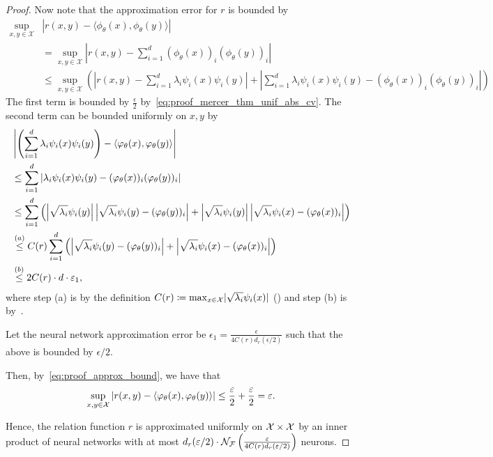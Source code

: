\begin{proof}
	Now note that the approximation error for $r$ is bounded by
	\begin{equation}\label{eq:proof_approx_bound}
		\begin{split}
			\sup_{x, y \in \mathcal{X}}&{
				\left\lvert r(x,y) - \langle \phi_\theta(x), \phi_\theta(y) \rangle \right\rvert}\\
			&= \sup_{x, y \in \mathcal{X}}{
				\left\lvert r(x,y) - \sum_{i=1}^{d}{(\phi_\theta(x))_i (\phi_\theta(y))_i} \right\rvert} \\
			&\leq \sup_{x,y \in \mathcal{X}}{ \left(
				\left\lvert r(x,y) - \sum_{i=1}^{d}{\lambda_i \psi_i(x) \psi_i(y)} \right\rvert
				+ \left\lvert \sum_{i=1}^{d}{\lambda_i \psi_i(x) \psi_i(y) - (\phi_\theta(x))_i (\phi_\theta(y))_i} \right\rvert  \right) }
		\end{split}
	\end{equation}
	The first term is bounded by $\frac{\epsilon}{2}$ by~\eqref{eq:proof_mercer_thm_unif_abs_cv}. The second term can be bounded uniformly on $x,y$ by
	\begin{equation*}
		\begin{split}
			&\left\lvert \left(\sum_{i=1}^{d}{\lambda_i \psi_i(x) \psi_i(y)}\right) - \langle \phi_\theta(x), \phi_\theta(y) \rangle \right\rvert  \\
			&\leq \sum_{i=1}^{d}{ \abs{ \lambda_i \psi_i(x) \psi_i(y) - (\phi_\theta(x))_i (\phi_\theta(y))_i}} \\
			&\leq \sum_{i=1}^{d}{\paren{
				\abs{\sqrt{\lambda_i} \psi_i(y)} \abs{\sqrt{\lambda_i} \psi_i(y) - (\phi_\theta(y))_i}
				+ \abs{\sqrt{\lambda_i} \psi_i(y)} \abs{\sqrt{\lambda_i} \psi_i(x) - (\phi_\theta(x))_i}
				}} \\
			&\stepa{\leq} C(r) \sum_{i=1}^{d}{\paren{
				\abs{\sqrt{\lambda_i} \psi_i(y) - (\phi_\theta(y))_i}
				+ \abs{\sqrt{\lambda_i} \psi_i(x) - (\phi_\theta(x))_i}
				}} \\
			&\stepb{\leq} 2 C(r) \cdot d \cdot \epsilon_1,
		\end{split}
	\end{equation*}
	where step (a) is by the definition $C(r) \coloneqq \max_{x \in {\mathcal{X}}} \lvert \sqrt{\lambda_i} \psi_i(x) \rvert$ () and step (b) is by~.

	Let the neural network approximation error be $\epsilon_1 = \frac{\epsilon}{4 C(r) d_r(\epsilon / 2)}$ such that the above is bounded by $\epsilon / 2$. 

	Then, by~\eqref{eq:proof_approx_bound}, we have that
	\begin{equation*}
		\sup_{x, y \in \mathcal{X}}{
			\abs{r(x,y) - \iprod{\phi_\theta(x)}{\phi_\theta(y)}}} \leq \frac{\epsilon}{2} + \frac{\epsilon}{2} = \epsilon.
	\end{equation*}

	Hence, the relation function $r$ is approximated uniformly on ${\mathcal{X}} \times {\mathcal{X}}$ by an inner product of neural networks with at most $d_r(\varepsilon / 2) \cdot {\mathcal{N}}_{\mathcal{F}}\left(\frac{\varepsilon}{4 C(r) d_r(\varepsilon / 2)}\right)$ neurons.

\end{proof}

